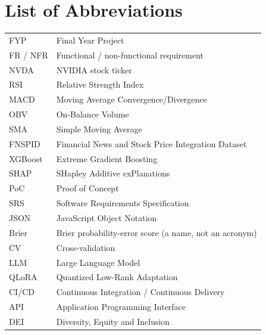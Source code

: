 \chapter*{List of Abbreviations}
\begin{longtable}{p{}p{}}
FYP & Final Year Project\\ FR / NFR & Functional / non-functional requirement\\
NVDA & NVIDIA stock ticker\\ RSI & Relative Strength Index\\ MACD & Moving Average Convergence/Divergence\\
OBV & On-Balance Volume\\ SMA & Simple Moving Average\\ FNSPID & Financial News and Stock Price Integration Dataset\\
XGBoost & Extreme Gradient Boosting\\ SHAP & SHapley Additive exPlanations\\
PoC & Proof of Concept\\ SRS & Software Requirements Specification\\ JSON & JavaScript Object Notation\\
Brier & Brier probability-error score (a name, not an acronym)\\ CV & Cross-validation\\
LLM & Large Language Model\\ QLoRA & Quantized Low-Rank Adaptation\\ CI/CD & Continuous Integration / Continuous Delivery\\
API & Application Programming Interface\\ DEI & Diversity, Equity and Inclusion\\
\end{longtable}
